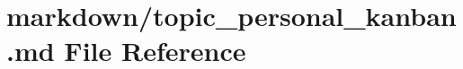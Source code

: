 \hypertarget{topic__personal__kanban_8md}{}\section{markdown/topic\+\_\+personal\+\_\+kanban.md File Reference}
\label{topic__personal__kanban_8md}
